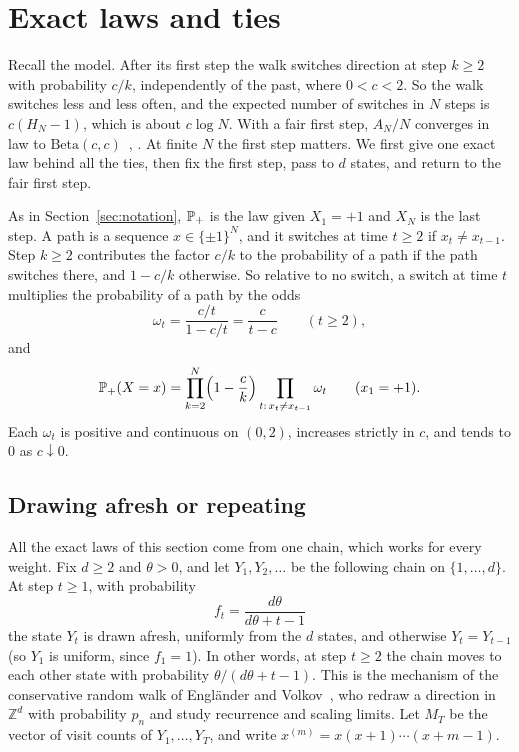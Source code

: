 \section{Exact laws and ties}\label{sec:aging}

Recall the model. After its first step the walk switches
direction at step $k\ge2$ with probability $c/k$, independently of the past,
where $0<c<2$. So the walk switches less and less often, and the expected
number of switches in $N$ steps is $c(H_N-1)$, which is about $c\log N$. With
a fair first step, $A_N/N$ converges in law to
$\mathrm{Beta}(c,c)$~\cite[Example~1.1 and Theorem~1.4]{ds2007},
\cite[Theorem~2]{ev2018}. At finite $N$ the first step
matters. We first give one exact law behind all the ties, then fix the first
step, pass to $d$ states, and return to the fair first step.

As in Section~\ref{sec:notation}, $\mathbb{P}_+$ is the law given $X_1=+1$ and
$X_N$ is the last step. A path is a sequence
$x\in\{\pm1\}^N$, and it switches at time $t\ge2$ if $x_t\ne x_{t-1}$. Step
$k\ge2$ contributes the factor $c/k$ to the probability of a path if the path
switches there, and $1-c/k$ otherwise. So relative to no switch, a switch at
time $t$ multiplies the probability of a path by the odds
\[
 \omega_t=\frac{c/t}{1-c/t}=\frac{c}{t-c}\qquad(t\ge2),
\]
and
\begin{equation}\label{eq:aging-path}
 \mathbb{P}_+(X=x)=\prod_{k=2}^N\Bigl(1-\frac ck\Bigr)\prod_{t:\,x_t\ne x_{t-1}}\omega_t
 \qquad(x_1=+1).
\end{equation}
Each $\omega_t$ is positive and continuous on $(0,2)$, increases strictly in
$c$, and tends to $0$ as $c\downarrow0$.

\subsection{Drawing afresh or repeating}\label{sec:aging-urn}

All the exact laws of this section come from one chain, which works for every
weight. Fix $d\ge2$ and $\theta>0$, and let $Y_1,Y_2,\dots$ be the following
chain on $\{1,\dots,d\}$. At step $t\ge1$, with probability
\[
 f_t=\frac{d\theta}{d\theta+t-1}
\]
the state $Y_t$ is drawn afresh, uniformly from the $d$ states, and otherwise
$Y_t=Y_{t-1}$ (so $Y_1$ is uniform, since $f_1=1$). In other words, at
step $t\ge2$ the chain moves to each other state with probability
$\theta/(d\theta+t-1)$. This is the mechanism of the conservative random walk
of Engl\"ander and Volkov~\cite{ev2022}, who redraw a direction in
$\mathbb Z^d$ with probability $p_n$ and study recurrence and scaling limits.
Let $M_T$ be the vector of visit counts of $Y_1,\dots,Y_T$, and write
$x^{(m)}=x(x+1)\cdots(x+m-1)$.

